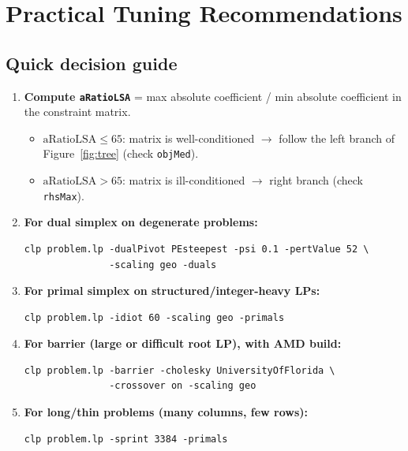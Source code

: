 \documentclass[11pt,a4paper]{article}
\begin{document}
\section{Practical Tuning Recommendations}
\label{sec:recs}

\subsection{Quick decision guide}

\begin{enumerate}
  \item \textbf{Compute \texttt{aRatioLSA}} = max absolute coefficient / min absolute
        coefficient in the constraint matrix.
  \begin{itemize}[noitemsep]
    \item $\text{aRatioLSA} \le 65$: matrix is well-conditioned $\to$ follow the
          left branch of Figure~\ref{fig:tree} (check \texttt{objMed}).
    \item $\text{aRatioLSA} > 65$: matrix is ill-conditioned $\to$ right branch
          (check \texttt{rhsMax}).
  \end{itemize}

  \item \textbf{For dual simplex on degenerate problems:}
\begin{lstlisting}
clp problem.lp -dualPivot PEsteepest -psi 0.1 -pertValue 52 \
               -scaling geo -duals
\end{lstlisting}

  \item \textbf{For primal simplex on structured/integer-heavy LPs:}
\begin{lstlisting}
clp problem.lp -idiot 60 -scaling geo -primals
\end{lstlisting}

  \item \textbf{For barrier (large or difficult root LP), with AMD build:}
\begin{lstlisting}
clp problem.lp -barrier -cholesky UniversityOfFlorida \
               -crossover on -scaling geo
\end{lstlisting}

  \item \textbf{For long/thin problems (many columns, few rows):}
\begin{lstlisting}
clp problem.lp -sprint 3384 -primals
\end{lstlisting}
\end{enumerate}
\end{document}
